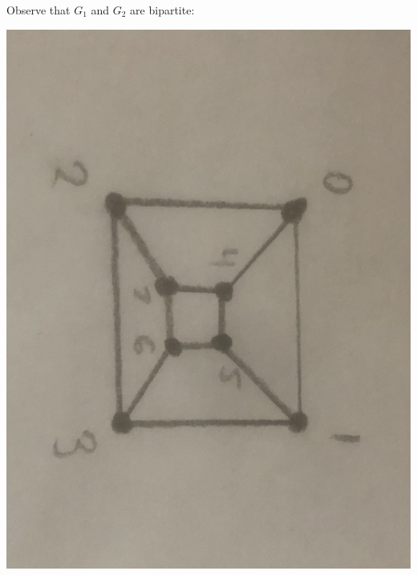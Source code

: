 \documentclass[12pt]{article}
\begin{document}
\newpage{}

Observe that $G_1$ and $G_2$ are bipartite:
\begin{center}
\includegraphics[scale=.05]{34G1.jpg}

\end{center}
\end{document}
